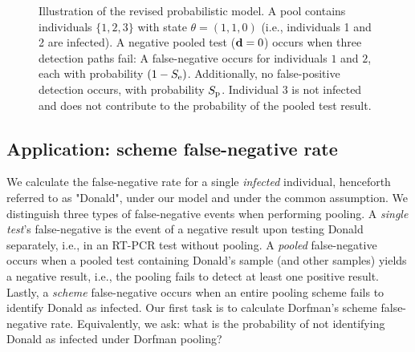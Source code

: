 \documentclass{article}
\begin{document}
\begin{figure}[H]
  \centering
  \caption{Illustration of the revised probabilistic model. A pool
    contains individuals $\{1,2,3\}$ with state $\theta=(1,1,0)$
    (i.e., individuals 1 and 2 are infected). A negative pooled test
    ($\mathbf{d}=0$) occurs when three detection paths fail: A
    false-negative occurs for individuals $1$ and $2$, each with
    probability $(1-S_{\text{e}})$.  Additionally, no false-positive
    detection occurs, with probability $S_{\text{p}}$. Individual $3$ is not
    infected and does not contribute to the probability of the pooled
    test result.}\label{fig:likelihood}
\end{figure}


\subsection*{Application: scheme false-negative rate}
We calculate the false-negative rate for a single \emph{infected}
individual, henceforth referred to as "Donald", under our model and
under the common assumption. We distinguish three types of
false-negative events when performing pooling. A \emph{single test}'s
false-negative is the event of a negative result upon testing Donald
separately, i.e., in an RT-PCR test without pooling. A \emph{pooled}
false-negative occurs when a pooled test containing Donald's sample
(and other samples) yields a negative result, i.e., the pooling fails
to detect at least one positive result. Lastly, a \emph{scheme}
false-negative occurs when an entire pooling scheme fails to identify
Donald as infected. Our first task is to calculate Dorfman's scheme
false-negative rate. Equivalently, we ask: what is the probability of
not identifying Donald as infected under Dorfman pooling?
\end{document}
